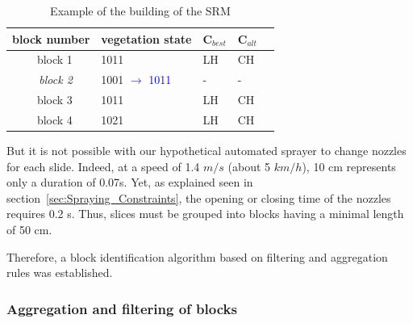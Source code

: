 \documentclass[preprint,3p,times,twocolumn]{elsarticle}
\begin{document}
\begin{table}[ht]
\centering
\begin{tabular}{rl|l|l|l|c}
	\multicolumn{2}{c}{\textbf{block number}} & \textbf{vegetation state} & \textbf{C$_{best}$} & \textbf{C$_{alt}$}  \\ \hline
	block 1 & & 1011 & LH	& CH \\
	\textit{block 2 }&& 1001 \textcolor{blue}{$\rightarrow$ 1011} & -   & - \\
	block 3 && 1011 & LH	& CH \\
	block 4 & & 1021 & LH & CH\\
\end{tabular}
\caption{Example of the building of the SRM}
\label{tab:SRM}
\end{table}
But it is not possible with our hypothetical automated sprayer to change nozzles for each slide. Indeed, at a speed of 1.4 $m/s$ (about 5 $km/h$), 10 cm represents only a duration of 0.07s. Yet, as explained seen in section~\ref{sec:Spraying_Constraints}, the opening or closing time of the nozzles requires 0.2 s. Thus, slices must be grouped into blocks having a minimal length of 50 cm. 

Therefore, a block identification algorithm based on filtering and aggregation rules was established.

\subsubsection{Aggregation and filtering of blocks}
\end{document}
